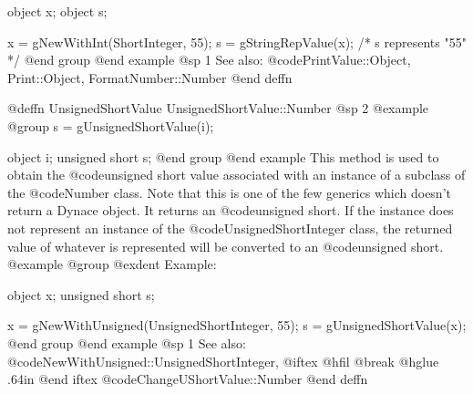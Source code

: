 object  x;
object  s;

x = gNewWithInt(ShortInteger, 55);
s = gStringRepValue(x);      /*  s represents "55"   */
@end group
@end example
@sp 1
See also:  @code{PrintValue::Object, Print::Object, FormatNumber::Number}
@end deffn










@deffn {UnsignedShortValue} UnsignedShortValue::Number
@sp 2
@example
@group
s = gUnsignedShortValue(i);

object  i;
unsigned short  s;
@end group
@end example
This method is used to obtain the @code{unsigned short} value associated
with an instance of a subclass of the @code{Number} class.  Note that
this is one of the few generics which doesn't return a Dynace object.
It returns an @code{unsigned short}.  If the instance does not represent
an instance of the @code{UnsignedShortInteger} class, the returned value
of whatever is represented will be converted to an @code{unsigned short}.
@example
@group
@exdent Example:

object  x;
unsigned short  s;

x = gNewWithUnsigned(UnsignedShortInteger, 55);
s = gUnsignedShortValue(x);
@end group
@end example
@sp 1
See also:  @code{NewWithUnsigned::UnsignedShortInteger,}
@iftex
@hfil @break @hglue .64in      
@end iftex
@code{ChangeUShortValue::Number}
@end deffn










